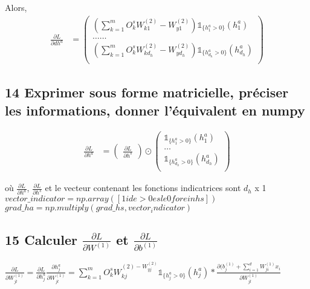 \documentclass[12pt]{article}
\begin{document}
Alors,\\
\begin{align*} 
\frac{\partial L}{\partial dh^a}&= 
	\left(
     \begin{array}{r}
         (\sum_{k=1}^m O_k^s W_{k1}^{(2)}-W_{y1}^{(2)})\mathbb{1}_{\{h_1^a > 0\}}(h_1^a)\\
        \dots  \dots\\ 
 	 (\sum_{k=1}^m O_k^s W_{kd_{h}}^{(2)}-W_{yd_{h}}^{(2)})\mathbb{1}_{\{h_{d_h}^a > 0\}}(h_{d_h}^a)\\
       \end{array}
     \right)
\end{align*}

 \subsection{14 Exprimer sous forme matricielle, préciser les informations, donner l'équivalent en numpy}



\begin{align*} 
\frac{\partial L}{\partial h^a} &= 
	\left(
     \begin{array}{r}
	\frac{\partial L}{\partial h^s}
       \end{array}
     \right) \odot
\left(
     \begin{array}{r}
	\mathbb{1}_{\{h_1^a > 0\}}(h_1^a)\\
	\dots\\
	\mathbb{1}_{\{h_{d_h}^a > 0\}}(h_{d_h}^a)\\
       \end{array}
     \right)
\end{align*}

où $\frac{\partial L}{\partial h^a}$, $\frac{\partial L}{\partial h^s}$ et le vecteur contenant les fonctions indicatrices sont $d_h$ x 1\\

$vector\_indicator = np.array([1 id e> 0 esle 0 for e in hs])$\\
$grad\_ha = np.multiply(grad\_hs, vector_indicator)$

 \subsection{15 Calculer $\frac{\partial L}{\partial W^{(1)}}$ et $\frac{\partial L}{\partial b^{(1)}}$}

$\frac{\partial L}{\partial W_{jl}^{(1)}} = \frac{\partial L}{\partial h_j^a}\frac{\partial h_j^a}{\partial W_{jl}^{(1)}} = \sum_{k=1}^m O_k^s W_{kj}^{(2) - W_{yj}^{(2)}}\mathbb{1}_{\{h_j^a>0\}}(h_j^a)*\frac{\partial (b_j^{(1)} + \sum_{i=1}^d W_{ji}^{(1)}x_i} {\partial W_{jl}^{(1)}}$\\
\end{document}
